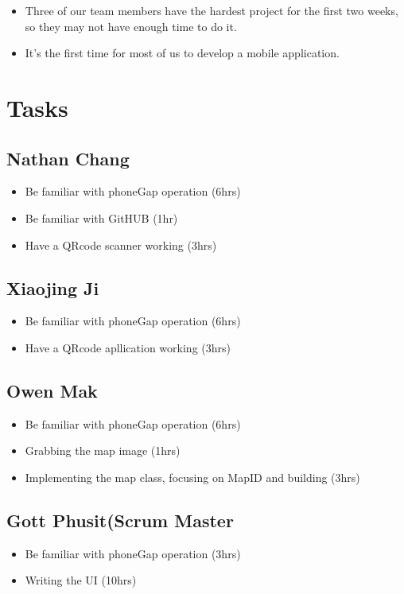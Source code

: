 \documentclass[12pt]{article}
\begin{document}
\begin{itemize}
\item Three of our team members have the hardest project for the first two weeks, so they may not have enough time to do it.
\item It's the first time for most of us to develop a mobile application.
\end{itemize}

\section*{Tasks}

\subsection*{Nathan Chang}
\begin{itemize}
\item Be familiar with phoneGap operation (6hrs)
\item Be familiar with GitHUB (1hr)
\item Have a QRcode scanner working   (3hrs)
\end{itemize}


\subsection*{Xiaojing Ji}
\begin{itemize}
\item Be familiar with phoneGap operation (6hrs)
\item Have a QRcode apllication working   (3hrs)
\end{itemize}



\subsection*{Owen Mak}
\begin{itemize}
\item Be familiar with phoneGap operation (6hrs)
\item Grabbing the map image   (1hrs)
\item Implementing the map class, focusing on MapID and building  (3hrs)
\end{itemize}

\subsection*{Gott Phusit(Scrum Master}
\begin{itemize}
\item Be familiar with phoneGap operation (3hrs)
\item Writing the UI (10hrs)
\end{itemize}
\end{document}

